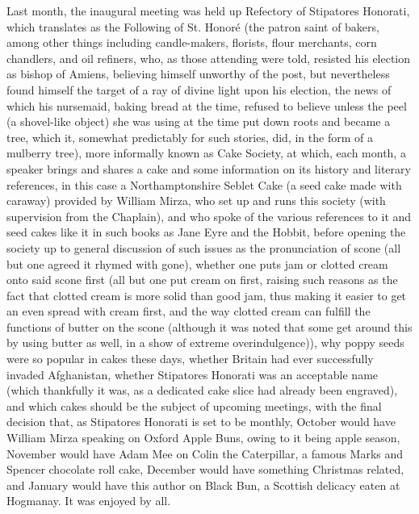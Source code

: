 \documentclass[11pt,a4paper]{report}
\begin{document}
	\begin{multicols}{2}
		
		Last month, the inaugural meeting was held up Refectory of Stipatores Honorati, which translates as the Following of St. Honoré (the patron saint of bakers, among other things including candle-makers, florists, flour merchants, corn chandlers, and oil refiners, who, as those attending were told, resisted his election as bishop of Amiens, believing himself unworthy of the post, but nevertheless found himself the target of a ray of divine light upon his election, the news of which his nursemaid, baking bread at the time, refused to believe unless the peel (a shovel-like object) she was using at the time put down roots and became a tree, which it, somewhat predictably for such stories, did, in the form of a mulberry tree), more informally known as Cake Society, at which, each month, a speaker brings and shares a cake and some information on its history and literary references, in this case a Northamptonshire Seblet Cake (a seed cake made with caraway) provided by William Mirza, who set up and runs this society (with supervision from the Chaplain), and who spoke of the various references to it and seed cakes like it in such books as Jane Eyre and the Hobbit, before opening the society up to general discussion of such issues as the pronunciation of scone (all but one agreed it rhymed with gone), whether one puts jam or clotted cream onto said scone first (all but one put cream on first, raising such reasons as the fact that clotted cream is more solid than good jam, thus making it easier to get an even spread with cream first, and the way clotted cream can fulfill the functions of butter on the scone (although it was noted that some get around this by using butter as well, in a show of extreme overindulgence)), why poppy seeds were so popular in cakes these days, whether Britain had ever successfully invaded Afghanistan, whether Stipatores Honorati was an acceptable name (which thankfully it was, as a dedicated cake slice had already been engraved), and which cakes should be the subject of upcoming meetings, with the final decision that, as Stipatores Honorati is set to be monthly, October would have William Mirza speaking on Oxford Apple Buns, owing to it being apple season, November would have Adam Mee on Colin the Caterpillar, a famous Marks and Spencer chocolate roll cake, December would have something Christmas related, and January would have this author on Black Bun, a Scottish delicacy eaten at Hogmanay. It was enjoyed by all.
		
	\end{multicols}
	
\end{document}
